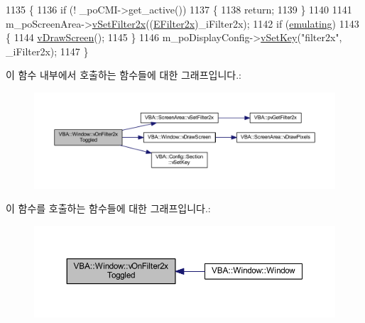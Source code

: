 \begin{DoxyCode}
1135 \{
1136   \textcolor{keywordflow}{if} (! \_poCMI->get\_active())
1137   \{
1138     \textcolor{keywordflow}{return};
1139   \}
1140 
1141   m\_poScreenArea->\mbox{\hyperlink{class_v_b_a_1_1_screen_area_ad42090409e7ddec2c1cd9d715a38f8d9}{vSetFilter2x}}((\mbox{\hyperlink{class_v_b_a_a1683020d7324daf3bda627d0d3658e3e}{EFilter2x}})\_iFilter2x);
1142   \textcolor{keywordflow}{if} (\mbox{\hyperlink{gb_globals_8h_af9cc36078b1b311753963297ae7f2a74}{emulating}})
1143   \{
1144     \mbox{\hyperlink{class_v_b_a_1_1_window_af82e47600303a15b2aa4fdffb90df394}{vDrawScreen}}();
1145   \}
1146   m\_poDisplayConfig->\mbox{\hyperlink{class_v_b_a_1_1_config_1_1_section_a57e1b95cbea40db71c093381beff4b0e}{vSetKey}}(\textcolor{stringliteral}{"filter2x"}, \_iFilter2x);
1147 \}
\end{DoxyCode}
이 함수 내부에서 호출하는 함수들에 대한 그래프입니다.\+:
\nopagebreak
\begin{figure}[H]
\begin{center}
\leavevmode
\includegraphics[width=350pt]{class_v_b_a_1_1_window_ad73fe13a9e4c8b40fbe6f0726210cc5c_cgraph}
\end{center}
\end{figure}
이 함수를 호출하는 함수들에 대한 그래프입니다.\+:
\nopagebreak
\begin{figure}[H]
\begin{center}
\leavevmode
\includegraphics[width=350pt]{class_v_b_a_1_1_window_ad73fe13a9e4c8b40fbe6f0726210cc5c_icgraph}
\end{center}
\end{figure}
\mbox{\label{class_v_b_a_1_1_window_afddc93921e9561601104184bb16941e5}} 
